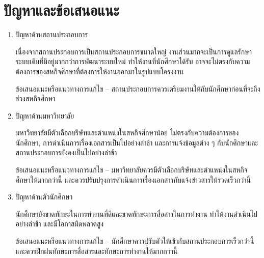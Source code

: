 \section{ปัญหาและข้อเสนอแนะ}
\begin{enumerate}
	\item ปัญหาด้านสถานประกอบการ
	
	เนื่องจากสถานประกอบการเป็นสถานประกอบการขนาดใหญ่ งานส่วนมากจะเป็นการดูแลรักษาระบบเดิมที่มีอยู่มากกว่าการพัฒนาระบบใหม่ ทำให้งานที่นักศึกษาได้รับ อาจจะไม่ตรงกับความต้องการของสหกิจศึกษาที่ต้องการให้งานออกมาในรูปแบบโครงงาน
	
	ข้อเสนอแนะหรือแนวทางการแก้ไข – สถานประกอบการควรเตรียมงานให้กับนักศึกษาก่อนที่จะถึงช่วงสหกิจศึกษา
	
	\item ปัญหาด้านมหาวิทยาลัย
	
	มหาวิทยาลัยมีตัวเลือกบริษัทและตำแหน่งในสหกิจศึกษาน้อย ไม่ตรงกับความต้องการของนักศึกษา, การดำเนินการเรื่องเอกสารเป็นไปอย่างล่าช้า และการแจ้งข้อมูลต่าง ๆ กับนักศึกษาและสถานประกอบการยังคงเป็นไปอย่างล่าช้า
	
	ข้อเสนอแนะหรือแนวทางการแก้ไข – มหาวิทยาลัยควรมีตัวเลือกบริษัทและตำแหน่งในสหกิจศึกษาให้มากกว่านี้ และควรปรับปรุงการดำเนินการเรื่องเอกสารกับแจ้งข่าวสารให้รวดเร็วกว่านี้
	
	\item ปัญหาด้านตัวนักศึกษา
	
	นักศึกษายังขาดทักษะในการทำงานที่ดีและขาดทักษะการสื่อสารในการทำงาน ทำให้งานดำเนินไปอย่างล่าช้า และมีโอกาสผิดพลาดสูง
	
	ข้อเสนอแนะหรือแนวทางการแก้ไข – นักศึกษาควรปรับตัวให้เข้ากับสถานประกอบการเร็วกว่านี้ และควรฝึกฝนทักษะการสื่อสารและทักษะการทำงานให้มากกว่านี้
\end{enumerate}